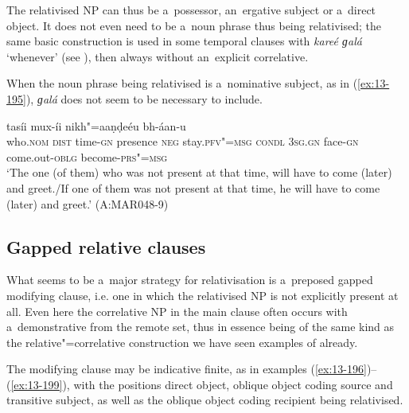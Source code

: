 

The relativised NP can thus be a~possessor, an~ergative subject or a~direct object. It does not even need to be a~noun phrase thus being relativised; the same basic construction is used in some temporal clauses with \textit{kareé ɡalá} `whenever' (see ), then always without an~explicit correlative.


When the noun phrase being relativised is a~nominative subject, as in (\ref{ex:13-195}), \textit{ɡalá} does not seem to be necessary to include. 

\begin{exe}
\ex
\label{ex:13-195}
 tasíi mux-íi nikh"=aaṇḍeéu bh-áan-u \\
who.\textsc{nom} \textsc{dist} time-\textsc{gn} presence \textsc{neg} stay.\textsc{pfv"=msg}  \textsc{condl } \textsc{3sg.gn} face-\textsc{gn} come.out-\textsc{oblg} become-\textsc{prs"=msg} \\
\glt `The one (of them) who was not present at that time, will have to come (later) and greet./If one of them was not present at that time, he will have to come (later) and greet.' (A:MAR048-9)
\end{exe}

\subsection{Gapped relative clauses}
\label{subsec:13-6-3}


What seems to be a~major strategy for relativisation is a~preposed gapped modifying clause, i.e. one in which the relativised NP is not explicitly present at all. Even here the correlative NP in the main clause often occurs with a~demonstrative from the remote set, thus in essence being of the same kind as the relative"=correlative construction we have seen examples of already.


The modifying clause may be indicative finite, as in examples (\ref{ex:13-196})--(\ref{ex:13-199}), with the positions direct object, oblique object coding source and transitive subject, as well as the oblique object coding recipient being relativised.

